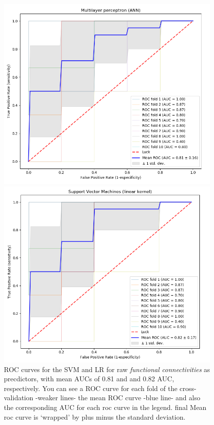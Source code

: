 \documentclass[a4paper,12pt]{elsarticle}  %
\begin{document}
				\begin{figure}[t]
				\centering
				\begin{minipage}{.5\textwidth}
					\centering
					\includegraphics[width=1\linewidth]{fig_MLP_fMRI_nodimreduc_ROC.png}
				\end{minipage}%
				\begin{minipage}{.5\textwidth}
					\centering
					\includegraphics[width=1\linewidth]{fig_SVM_fMRI_nodimreduc_ROC.png}
				\end{minipage}
				\caption{ROC curves for the SVM and LR for raw \textit{functional connectivities} as precdictors, with mean AUCs of 0.81 and and 0.82 AUC, respectively. You can see a ROC curve for each fold of the cross-validation -weaker lines- the mean ROC curve -blue line- and also the corresponding AUC for each roc curve in the legend. final Mean roc curve is `wrapped' by plus minus the standard deviation.}
				\label{fig:MLPiSVM_ROCs}
			\end{figure}
\end{document}
